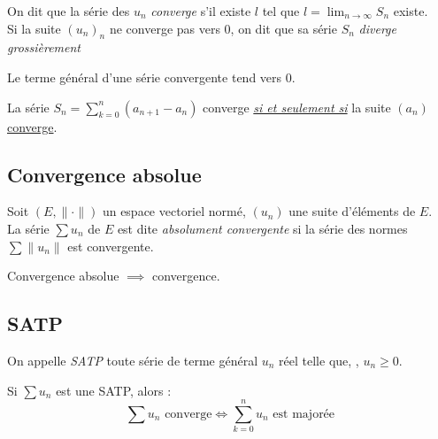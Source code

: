 \documentclass[11pt,a4paper,fleqn,pdftex]{report}
\begin{document}
\begin{dfn}
    On dit que la série des $u_n$ \emph{converge} s'il existe $l$ tel que $l = \lim_{n\to \infty} S_n$ existe.\\
    Si la suite $(u_n)_n$ ne converge pas vers $0$, on dit que sa série $S_n$ \emph{diverge grossièrement}
\end{dfn}
\begin{theorem}
     Le terme général d'une série convergente tend vers $0$.
\end{theorem}
\begin{itheorem}
    La série $S_n = \sum_{k=0}^n (a_{n+1}-a_n)$ converge \emph{\uline{si et seulement si}} la suite $(a_n)$ \uline{converge}.
\end{itheorem}
\subsection{Convergence absolue} %
\label{sub:convergence_absolue}
\begin{dfn}
     Soit $(E, \| \cdot \|)$ un espace vectoriel normé, $(u_n)$ une suite d'éléments de $E$. \\
La série $\sum u_n$ de $E$ est dite \emph{absolument convergente} si la série des normes $\sum \| u_n \|$ est convergente.
\end{dfn}
\begin{itheorem}
     Convergence absolue $\implies $ convergence.
\end{itheorem}
\subsection{\acrlong{SATP}}
\begin{dfn}
    On appelle \emph{\acrfull{SATP}} toute série de terme général $u_n$ réel telle que, , $u_n \ge 0$.
\end{dfn}
\begin{itheorem}
    Si $\sum u_n$ est une \gls{SATP}, alors :
    \begin{equation}
        \sum u_n \text{ converge} \Leftrightarrow \sum_{k=0}^n u_n \text{ est majorée}
    \end{equation}
\end{itheorem}
\end{document}
